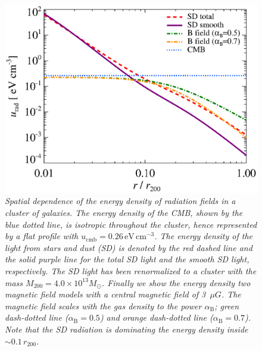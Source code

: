 \documentclass[10pt,aps,pra,reprint,amsmath,amsfonts,amssymb,showpacs]{revtex4-1}
\def\del#1{{}}
\newcommand{\rmn}{\mathrm}
\newcommand{\msun}{M_\odot}
\newcommand{\rvir}{r_{200}}
\newcommand{\mvir}{M_{200}}
\begin{document}
\begin{figure}%
 \includegraphics[width=0.99\columnwidth]{figures/ucool.eps}
 \caption{\it Spatial dependence of the energy density of radiation
   fields in a cluster of galaxies. The energy density of the CMB,
   shown by the blue dotted line, is isotropic throughout the cluster,
   hence represented by a flat profile with
   $u_\rmn{cmb}=0.26\,\rmn{eV}\,\rmn{cm}^{-3}$. The energy density of
   the light from stars and dust (SD) is denoted by the red dashed
   line and the solid purple line for the total SD light and the
   smooth SD light, respectively. The SD light has been renormalized
   to a cluster with the mass $\mvir=4.0\times10^{13}\msun$. Finally we
   show the energy density two magnetic field models with a central
   magnetic field of 3~$\mu G$. The magnetic field scales with the gas
   density to the power $\alpha_\rmn{B}$; green dash-dotted line
   ($\alpha_\rmn{B}=0.5$) and orange dash-dotted line
   ($\alpha_\rmn{B}=0.7$). Note that the SD radiation is dominating
   the energy density inside $\sim0.1\,\rvir$.}
 \label{fig:SD_Edens}
\end{figure}


\del{In this section we present the formalism for the different
galaxy cluster emission components and show their contribution to the
total dark matter gamma-ray spectrum. We account for the emission
radiated both by final state radiation and inverse Compton where we
allow for upscattering through CMB, starlight, and dust.}


\end{document}
